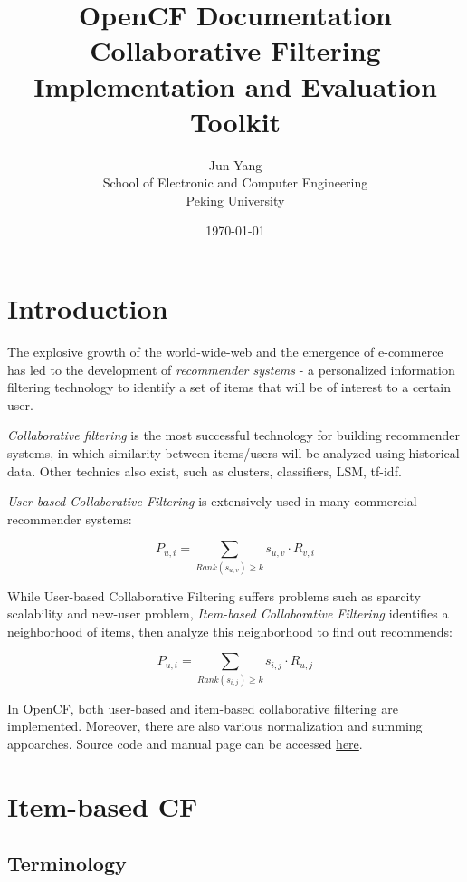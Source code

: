 \documentclass[11pt,a4paper,titlepage]{article}
\title{\Huge{OpenCF Documentation} \\ \vspace{1em} \Large{Collaborative Filtering Implementation and Evaluation Toolkit}}
\author{Jun Yang \\ School of Electronic and Computer Engineering \\ Peking University}
\date{\today}
\begin{document}
\maketitle 

\tableofcontents
\clearpage


\section{Introduction}

The explosive growth of the world-wide-web and the emergence of e-commerce has led to the development of \emph{recommender systems} - a personalized information filtering technology to identify a set of items that will be of interest to a certain user.\cite{karypis2001evaluation}


\emph{Collaborative filtering} is the most successful technology for building recommender systems, in which similarity between items/users will be analyzed using historical data. Other technics also exist, such as clusters, classifiers, LSM, tf-idf.


\emph{User-based Collaborative Filtering} is extensively used in many commercial recommender systems:

\begin{equation}
P_{u,i} = \sum_{Rank(s_{u,v})\geq k}s_{u,v} \cdot R_{v,i}
\end{equation}

While User-based Collaborative Filtering suffers problems such as sparcity scalability and new-user problem, 
\emph{Item-based Collaborative Filtering} identifies a neighborhood of items, then analyze this neighborhood to find out recommends:

\begin{equation}
P_{u,i} = \sum_{Rank(s_{i,j})\geq k}s_{i,j} \cdot R_{u,j}
\end{equation}

In OpenCF, both user-based and item-based collaborative filtering are implemented. Moreover, there are also various normalization and summing appoarches. Source code and manual page can be accessed \href{https://github.com/harttle/OpenCF}{here}.

\section{Item-based CF}

\subsection{Terminology}
\end{document}
